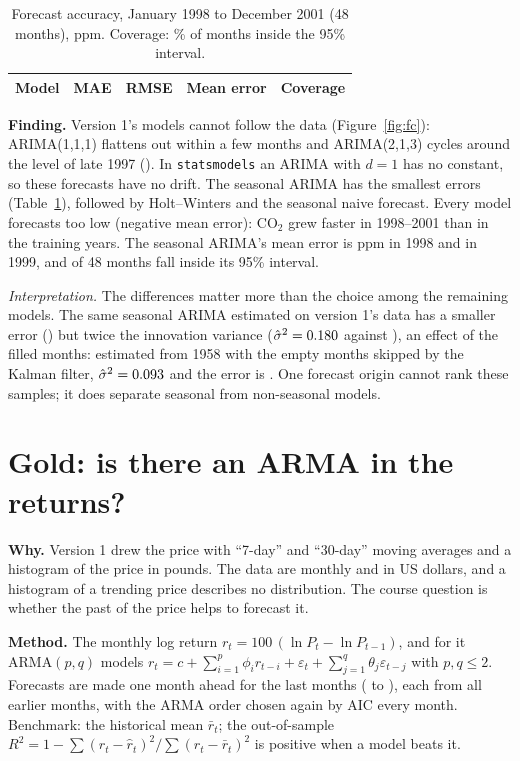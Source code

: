 \documentclass[11pt,a4paper]{article}
\begin{document}
\begin{table}[!htb]
\centering\small
\caption{Forecast accuracy, January 1998 to December 2001 (48 months), ppm. Coverage: \% of months inside the
95\% interval.}\label{tab:acc}
\begin{tabular}{lrrrr}
\toprule
Model & MAE & RMSE & Mean error & Coverage \\
\midrule

\end{tabular}
\end{table}

\textbf{Finding.} Version 1's models cannot follow the data (Figure~\ref{fig:fc}): ARIMA(1,1,1) flattens out within
a few months and ARIMA(2,1,3) cycles around the level of late 1997 (\ArimaBConv). In \texttt{statsmodels} an ARIMA with $d = 1$
has no constant, so these forecasts have no drift. The seasonal ARIMA has the smallest errors (Table~\ref{tab:acc}),
followed by Holt--Winters and the seasonal naive forecast. Every model forecasts too low (negative mean error):
CO$_2$ grew faster in 1998--2001 than in the training years. The seasonal ARIMA's mean error is \ErrNinetyEight{}
ppm in 1998 and \ErrNinetyNine{} in 1999, and \InsideSarima{} of 48 months fall inside its 95\% interval.

\textit{Interpretation.} The differences matter more than the choice among the remaining models. The same seasonal
ARIMA estimated on version 1's data has a smaller error (\MaeSarimaVone) but twice the innovation variance
($\hat\sigma^2 = 0.180$ against \SigmaVtwo), an effect of the filled months: estimated from 1958 with the
empty months skipped by the Kalman filter, $\hat\sigma^2 = 0.093$ and the error is \MaeSkipped. One forecast
origin cannot rank these samples; it does separate seasonal from non-seasonal models.



\section{Gold: is there an ARMA in the returns?}

\textbf{Why.} Version 1 drew the price with ``7-day'' and ``30-day'' moving averages and a histogram of the
price in pounds. The data are monthly and in US dollars, and a histogram of a trending price describes no
distribution. The course question is whether the past of the price helps to forecast it.

\textbf{Method.} The monthly log return $r_t = 100\,(\ln P_t - \ln P_{t-1})$, and for it ARMA$(p,q)$ models
$r_t = c + \sum_{i=1}^{p}\phi_i r_{t-i} + \varepsilon_t + \sum_{j=1}^{q}\theta_j\varepsilon_{t-j}$ with $p, q \le 2$.
Forecasts are made one month ahead for the last \GoOosMonths{} months (\GoOosFirst{} to \GoOosLast), each from
all earlier months, with the ARMA order chosen again by AIC every month. Benchmark: the historical mean
$\bar r_t$; the out-of-sample $R^2 = 1 - \sum (r_t - \hat r_t)^2 / \sum (r_t - \bar r_t)^2$ is positive when a model
beats it.
\end{document}
